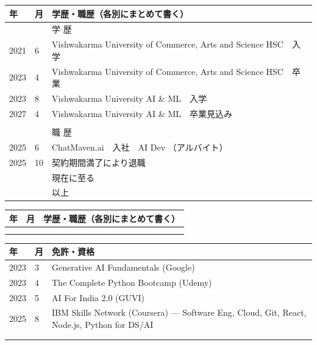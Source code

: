 \documentclass[9pt,a4paper]{article}
\begin{document}
\noindent
\begin{tabularx}{\textwidth}{|p{16mm}|p{10mm}|X|}
\hline
\centering 年 & \centering 月 & \centering 学歴・職歴（各別にまとめて書く） \tabularnewline \hline
& & \centering 学 歴 \tabularnewline
2021 & 6  & Vishwakarma University of Commerce, Arts and Science HSC　入学 \\
2023 & 4  & Vishwakarma University of Commerce, Arts and Science HSC　卒業 \\
2023 & 8  & Vishwakarma University AI \& ML　入学 \\
2027 & 4  & Vishwakarma University AI \& ML　卒業見込み \\
& & \\
& & \centering 職 歴 \tabularnewline
2025 & 6  & ChatMaven.ai　入社　AI Dev （アルバイト） \\
2025 & 10 & 契約期間満了により退職 \\
& & \hfill 現在に至る \tabularnewline
& & \hfill 以上 \tabularnewline
\hline
\end{tabularx}

\newpage

\noindent
\begin{tabularx}{\textwidth}{|p{16mm}|p{10mm}|X|}
\hline
\centering 年 & \centering 月 & \centering 学歴・職歴（各別にまとめて書く） \tabularnewline \hline
\rule{0pt}{14pt} & & \\
\rule{0pt}{14pt} & & \\
\hline
\end{tabularx}
\vspace*{-0.5pt}

\noindent
\begin{tabularx}{\textwidth}{|p{16mm}|p{10mm}|X|}
\hline
\centering 年 & \centering 月 & \centering 免許・資格 \tabularnewline \hline
2023 & 3  & Generative AI Fundamentals (Google) \\
2023 & 4  & The Complete Python Bootcamp (Udemy) \\
2023 & 5  & AI For India 2.0 (GUVI) \\
2025 & 8  & IBM Skills Network (Coursera) --- Software Eng, Cloud, Git, React, Node.js, Python for DS/AI \\
\rule{0pt}{14pt} & & \\
\rule{0pt}{14pt} & & \\
\hline
\end{tabularx}
\vspace{4mm}
\end{document}
